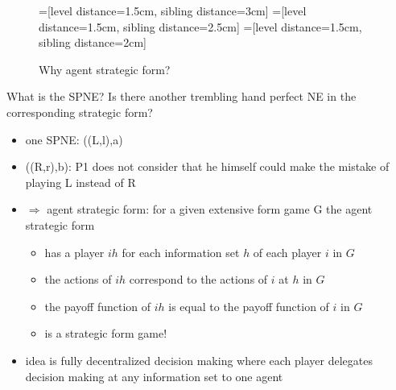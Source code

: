 \documentclass{beamer}    %
\newcommand{\Ra}{\Rightarrow}
\theoremstyle{plain}
\theoremstyle{definition}
\begin{document}
{%
\begin{figure}
\centering
{}=[level distance=1.5cm, sibling distance=3cm]
=[level distance=1.5cm, sibling distance=2.5cm]
=[level distance=1.5cm, sibling distance=2cm]
\caption{Why agent strategic form?}
\label{fig:why_agent_strat_form}
\end{figure}

What is the SPNE? Is there another trembling hand perfect NE in the corresponding strategic form?

\framebreak

\begin{itemize}
\item one SPNE: ((L,l),a)
\item  ((R,r),b): %
  P1 does not consider that he himself could make the mistake of playing L instead of R%
\item $\Ra$ agent strategic form: for a given extensive form game G the agent strategic form
  \begin{itemize}
  \item has a player $ih$ for each information set $h$ of each player $i$ in $G$
  \item the actions of $ih$ correspond to the actions of $i$ at $h$ in $G$
  \item the payoff function of $ih$ is equal to the payoff function of $i$ in $G$
  \item is a strategic form game!
  \end{itemize}
\item idea is fully decentralized decision making where each player delegates decision making at any information set to one agent


\end{itemize}}
\end{document}
